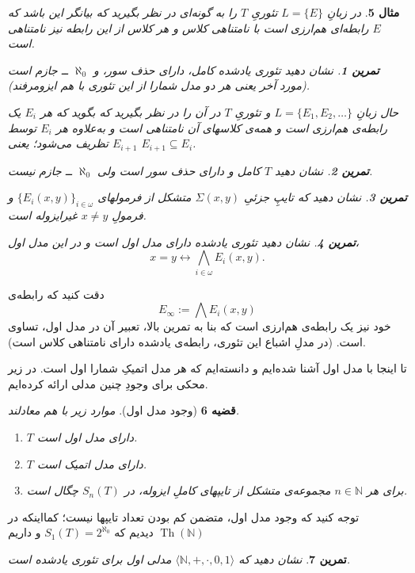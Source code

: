 \documentclass[12pt,a4paper]{report}
\theoremstyle{colorhead}
\newtheorem{thm}{قضیه}
\newtheorem{tam}[thm]{تمرین}
\newtheorem{mesal}[thm]{مثال}
\DeclareMathOperator{\Th}{Th}
\begin{document}
\begin{mesal}
در زبانِ
$L=\{E\}$
تئوریِ
$T$
را به گونه‌ای در نظر بگیرید که بیانگر این  باشد که
$E$
رابطه‌ای هم‌ارزی است با نامتناهی کلاس و هر کلاس از این رابطه نیز نامتناهی است.
\begin{tam}
نشان دهید تئوری یادشده کامل، دارای حذف سور، و 
$\aleph_0$
ــ‌ جازم است (مورد آخر یعنی هر دو مدل شمارا از این تئوری با هم ایزومرفند).
\end{tam}
حال زبانِ
$L=\{E_1,E_2,\ldots\}$
و تئوریِ
$T$
در آن را در نظر بگیرید که بگوید که
هر
$E_i$
یک رابطه‌ی هم‌ارزی است و همه‌ی کلاسهای آن نامتناهی است و به‌علاوه 
هر
$E_i$
توسط
$E_{i+1}$
تظریف می‌شود؛ یعنی
$E_{i+1}\subseteq E_i$.
\begin{tam}
نشان دهید
$T$
کامل و دارای حذف سور است ولی
$\aleph_0$  ــ‌
جازم نیست.
\end{tam}
\begin{tam}
نشان دهید که
تایپِ جزئیِ
$\Sigma(x,y)$
متشکل از فرمولهای
$\{E_i(x,y)\}_{i\in \omega}$
و فرمولِ
$x\not=y$
غیرایزوله است.
\end{tam}
\begin{tam}
نشان دهید تئوری یادشده دارای مدل اول است و در این مدل اول،
\[
x=y\leftrightarrow \bigwedge_{i\in \omega} E_i(x,y).\]
\end{tam}
\end{mesal}
دقت کنید که رابطه‌ی
\[
E_\infty:=\bigwedge E_i(x,y)
\]
خود نیز یک رابطه‌ی هم‌ارزی است که بنا به تمرین بالا، تعبیر آن در مدل اول، تساوی است. (در مدلِ اشباع این تئوری، رابطه‌ی
یادشده دارای نامتناهی کلاس است).
\par 
تا اینجا با مدل اول آشنا شده‌ایم و دانسته‌ایم که هر مدل اتمیکِ شمارا اول است. در زیر محکی برای
وجودِ چنین مدلی ارائه کرده‌ایم.
\begin{thm}[وجود مدل اول]
موارد زیر با هم معادلند.
\begin{enumerate}
\item 
$T$
دارای مدل اول است.
\item 
$T$
دارای مدل اتمیک است.
\item 
برای هر
$n\in \mathbb{N}$
مجموعه‌ی متشکل از تایپهای کاملِ
ایزوله، در
$S_n(T)$
چگال است. 
\end{enumerate}
\end{thm}
توجه کنید که وجود مدل اول، متضمن کم بودن تعداد تایپها نیست؛ کمااینکه در
$\Th(\mathbb{N})$
دیدیم که 
$S_1(T)=2^{\aleph_0}$
و داریم
\begin{tam}
نشان دهید که 
$\langle \mathbb{N},+,\cdot,0,1\rangle$
مدلی اول برای تئوری یادشده است. 
\end{tam}
\pagebreak
\end{document}

